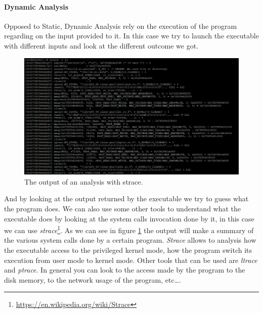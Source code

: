 \documentclass{article}
\begin{document}
\paragraph{Dynamic Analysis}
Opposed to Static, Dynamic Analysis rely on the execution of the program regarding on the input provided to it. In this case we try to launch the executable with different inputs and look at the different outcome we got.
\begin{figure}[htp]
    \centering
    \includegraphics[width=1\textwidth]{images/strace.png}
    \caption{The output of an analysis with strace.}
    \label{fig:strace}
\end{figure}
And by looking at the output returned by the executable we try to guess what the program does. We can also use some other tools to understand what the executable does by looking at the system calls invocation done by it, in this case we can use \textit{strace}\footnote{\url{https://en.wikipedia.org/wiki/Strace}}. As we can see in figure \ref{fig:strace} the output will make a summary of the various system calls done by a certain program.
\textit{Strace} allows to analysis how the executable access to the privileged kernel mode, how the program switch its execution from user mode to kernel mode. Other tools that can be used are \textit{ltrace} and \textit{ptrace}. In general you can look to the access made by the program to the disk memory, to the network usage of the program, etc\dots.
\end{document}

